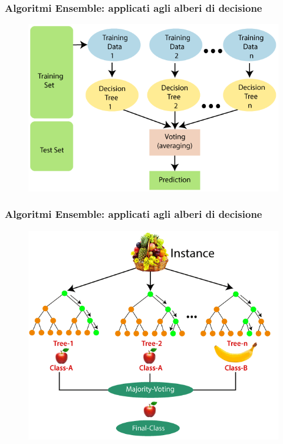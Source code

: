 \begin{frame}
	

\end{frame}


\begin{frame}

	\frametitle{Algoritmi Ensemble: applicati agli alberi di decisione}

	\begin{figure}[!htbp]
		\centering
		\includegraphics[width=0.8\linewidth]{images/supervised/z_algorithms_ensemble/random_forest_algorithm_1.png}
	\end{figure}

\end{frame}


\begin{frame}

	\frametitle{Algoritmi Ensemble: applicati agli alberi di decisione}

	\begin{figure}[!htbp]
		\centering
		\includegraphics[width=0.7\linewidth]{images/supervised/z_algorithms_ensemble/random_forest_algorithm_2.png}
	\end{figure}

\end{frame}



